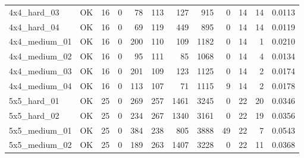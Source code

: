 \begin{tabular}{l l r r r r r r r r r r }
4x4\_hard\_03 & OK & 16 & 0 & 78 & 113 & 127 & 915 & 0 & 14 & 14 & 0.0113 \\
4x4\_hard\_04 & OK & 16 & 0 & 69 & 119 & 449 & 895 & 0 & 14 & 14 & 0.0119 \\
4x4\_medium\_01 & OK & 16 & 0 & 200 & 110 & 109 & 1182 & 0 & 14 & 1 & 0.0210 \\
4x4\_medium\_02 & OK & 16 & 0 & 95 & 111 & 85 & 1068 & 0 & 14 & 4 & 0.0134 \\
4x4\_medium\_03 & OK & 16 & 0 & 201 & 109 & 123 & 1125 & 0 & 14 & 2 & 0.0174 \\
4x4\_medium\_04 & OK & 16 & 0 & 113 & 107 & 71 & 1115 & 9 & 14 & 2 & 0.0178 \\
5x5\_hard\_01 & OK & 25 & 0 & 269 & 257 & 1461 & 3245 & 0 & 22 & 20 & 0.0346 \\
5x5\_hard\_02 & OK & 25 & 0 & 234 & 267 & 1340 & 3161 & 0 & 22 & 19 & 0.0356 \\
5x5\_medium\_01 & OK & 25 & 0 & 384 & 238 & 805 & 3888 & 49 & 22 & 7 & 0.0543 \\
5x5\_medium\_02 & OK & 25 & 0 & 189 & 263 & 1407 & 3228 & 0 & 22 & 11 & 0.0368 \\
\hline
\end{tabular}

